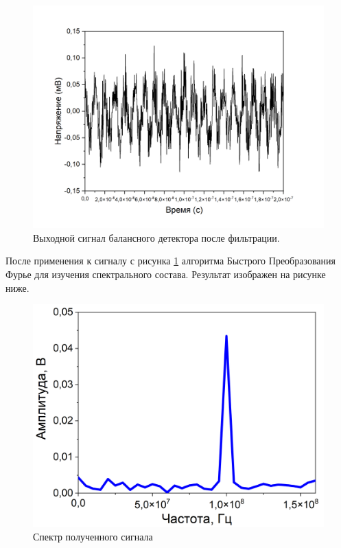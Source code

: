\begin{figure}
    \centering
    \includegraphics[width=\textwidth]{images/сигнал после бд с новыми шкалами.png}
    \caption{Выходной сигнал балансного детектора после фильтрации.}
    \label{fig:filter 100 mhz ch2}
\end{figure}
После применения к сигналу с рисунка \ref{fig:filter 100 mhz ch2} алгоритма Быстрого Преобразования Фурье для изучения спектрального состава. Результат изображен на рисунке ниже.
\begin{figure}
    \centering
    \includegraphics[width=\textwidth]{images/05.png}
    \caption{Спектр полученного сигнала}
    \label{fig:spectrum ch2}
\end{figure}
